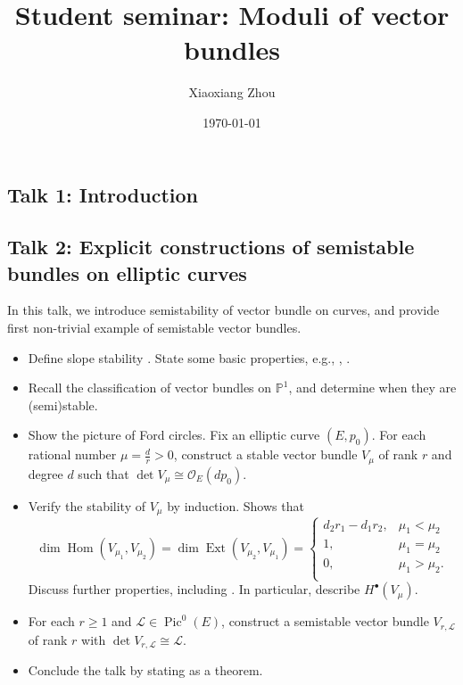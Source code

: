 \documentclass[UTF8]{amsart}
\numberwithin{equation}{section}
\theoremstyle{plain}
\numberwithin{equation}{section}
\theoremstyle{remark}
\DeclareMathOperator{\Hom}{\operatorname{Hom}}	\DeclareMathOperator{\End}{\operatorname{End}}
\DeclareMathOperator{\Ext}{\operatorname{Ext}}
\DeclareMathOperator{\Pic}{\operatorname{Pic}}
\begin{document}
\date{\today}

\title
{Student seminar: Moduli of vector bundles
}
\author{Xiaoxiang Zhou}
\address{Institut für Mathematik\\
Humboldt-Universität zu Berlin\\
Berlin, 12489\\ Germany\\} 


\maketitle
\subsection*{Talk 1: Introduction}

\subsection*{Talk 2: Explicit constructions of semistable bundles on elliptic curves}

In this talk, we introduce semistability of vector bundle on curves, and provide first non-trivial example of semistable vector bundles.

\begin{itemize}
\item Define slope stability \cite[Definition 2.3]{MS19}. State some basic properties, e.g., \cite[Exercise 2.4]{MS19}, \cite[14.1]{Potier97}.
\item Recall the classification of vector bundles on $\mathbb{P}^1$, and determine when they are (semi)stable.
\item Show the picture of Ford circles. Fix an elliptic curve $(E, p_0)$. For each rational number $\mu = \frac{d}{r} > 0$, construct a stable vector bundle $V_\mu$ of rank $r$ and degree $d$ such that $\det V_\mu \cong \mathcal{O}_E(dp_0)$. \cite[14.3]{Potier97}
\item Verify the stability of $V_\mu$ by induction. Shows that
$$
\dim \Hom (V_{\mu_1}, V_{\mu_2}) =\dim \Ext (V_{\mu_2}, V_{\mu_1}) = \begin{cases}
d_2r_1-d_1r_2, & \mu_1 < \mu_2 \\
1, & \mu_1 = \mu_2 \\
0, & \mu_1 > \mu_2. \\
\end{cases}
$$
Discuss further properties, including \cite[Corollary 14.11]{Potier97}. In particular, describe $H^{\bullet}(V_\mu)$.
\item For each $r \geq 1$ and $\mathcal{L} \in \Pic^0(E)$, construct a semistable vector bundle $V_{r, \mathcal{L}}$ of rank $r$ with $\det V_{r, \mathcal{L}} \cong \mathcal{L}$.
\item Conclude the talk by stating \cite[Example 2.7]{MS19} as a theorem.

\end{itemize}
\end{document}

